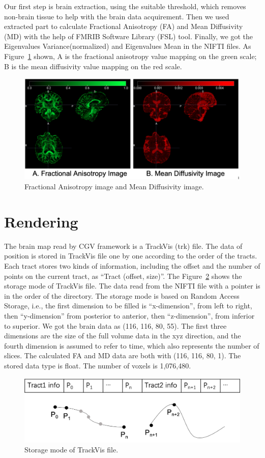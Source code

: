 \documentclass[hyperref, plainreport, noproblem]{cgvpub1}
\begin{document}
Our first step is brain extraction, using the suitable threshold, which removes non-brain tissue to help with the brain data acquirement. Then we used extracted part to calculate Fractional Anisotropy (FA) and Mean Diffusivity (MD) with the help of FMRIB Software Library (FSL) tool. Finally, we got the Eigenvalues Variance(normalized) and Eigenvalues Mean in the NIFTI files. As Figure~\ref{fig:3} shown, A is the fractional anisotropy value mapping on the green scale; B is the mean diffusivity value mapping on the red scale.
\begin{figure}[ht]
    \centering
    \includegraphics[width = 0.7\columnwidth]{3}
    \caption{ Fractional Anisotropy image and Mean Diffusivity image.}
    \label{fig:3}
\end{figure}	

\section{Rendering}

The brain map read by CGV framework is a TrackVis (trk) file. The data of position is stored in TrackVis file one by one according to the order of the tracts.  Each tract stores two kinds of information, including the offset and the number of points on the current tract, as “Tract (offset, size)”. The Figure~\ref{fig:4} shows the storage mode of TrackVis file. The data read from the NIFTI file with a pointer is in the order of the directory. The storage mode is based on Random Access Storage, i.e., the first dimension to be filled is “x-dimension”, from left to right, then “y-dimension” from posterior to anterior, then “z-dimension”, from inferior to superior. We got the brain data as (116, 116, 80, 55). The first three dimensions are the size of the full volume data in the xyz direction, and the fourth dimension is assumed to refer to time, which also represents the number of slices. The calculated FA and MD data are both with (116, 116, 80, 1). The stored data type is float. The number of voxels is 1,076,480.

\begin{figure}[ht]
    \centering
    \includegraphics[width = 0.8\columnwidth]{4}
    \caption{Storage mode of TrackVis file.}
    \label{fig:4}
\end{figure}	
\end{document}
